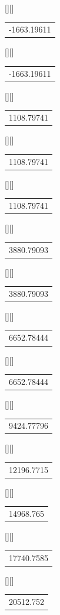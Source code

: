 \begin{psfrags}
[][]{\color[rgb]{0,0,0}\setlength{\tabcolsep}{0pt}\begin{tabular}{c}-1663.19611\end{tabular}}%
[][]{\color[rgb]{0,0,0}\setlength{\tabcolsep}{0pt}\begin{tabular}{c}-1663.19611\end{tabular}}%
[][]{\color[rgb]{0,0,0}\setlength{\tabcolsep}{0pt}\begin{tabular}{c}1108.79741\end{tabular}}%
[][]{\color[rgb]{0,0,0}\setlength{\tabcolsep}{0pt}\begin{tabular}{c}1108.79741\end{tabular}}%
[][]{\color[rgb]{0,0,0}\setlength{\tabcolsep}{0pt}\begin{tabular}{c}1108.79741\end{tabular}}%
[][]{\color[rgb]{0,0,0}\setlength{\tabcolsep}{0pt}\begin{tabular}{c}3880.79093\end{tabular}}%
[][]{\color[rgb]{0,0,0}\setlength{\tabcolsep}{0pt}\begin{tabular}{c}3880.79093\end{tabular}}%
[][]{\color[rgb]{0,0,0}\setlength{\tabcolsep}{0pt}\begin{tabular}{c}6652.78444\end{tabular}}%
[][]{\color[rgb]{0,0,0}\setlength{\tabcolsep}{0pt}\begin{tabular}{c}6652.78444\end{tabular}}%
[][]{\color[rgb]{0,0,0}\setlength{\tabcolsep}{0pt}\begin{tabular}{c}9424.77796\end{tabular}}%
[][]{\color[rgb]{0,0,0}\setlength{\tabcolsep}{0pt}\begin{tabular}{c}12196.7715\end{tabular}}%
[][]{\color[rgb]{0,0,0}\setlength{\tabcolsep}{0pt}\begin{tabular}{c}14968.765\end{tabular}}%
[][]{\color[rgb]{0,0,0}\setlength{\tabcolsep}{0pt}\begin{tabular}{c}17740.7585\end{tabular}}%
[][]{\color[rgb]{0,0,0}\setlength{\tabcolsep}{0pt}\begin{tabular}{c}20512.752\end{tabular}}%

\end{psfrags}
